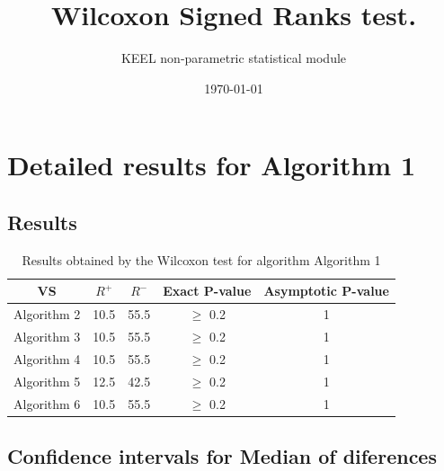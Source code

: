 \documentclass[a4paper,10pt]{article}
\title{Wilcoxon Signed Ranks test.}
\date{\today}
\author{KEEL non-parametric statistical module}
\begin{document}
\pagestyle{empty}
\maketitle
\thispagestyle{empty}



\section{Detailed results for Algorithm 1}


\subsection{Results}

\begin{table}[!htp]
\centering\small
\begin{tabular}{
|c|c|c|c|c|}
\hline
 VS & $R^{+}$ & $R^{-}$ & Exact P-value & Asymptotic P-value \\ \hline 
Algorithm 2 & 10.5 & 55.5 & $\geq$ 0.2 & 1\\ \hline 
Algorithm 3 & 10.5 & 55.5 & $\geq$ 0.2 & 1\\ \hline 
Algorithm 4 & 10.5 & 55.5 & $\geq$ 0.2 & 1\\ \hline 
Algorithm 5 & 12.5 & 42.5 & $\geq$ 0.2 & 1\\ \hline 
Algorithm 6 & 10.5 & 55.5 & $\geq$ 0.2 & 1\\ \hline 

\end{tabular}
\caption{Results obtained by the Wilcoxon test for algorithm Algorithm 1}
\end{table}

\subsection{Confidence intervals for Median of diferences}
\end{document}

